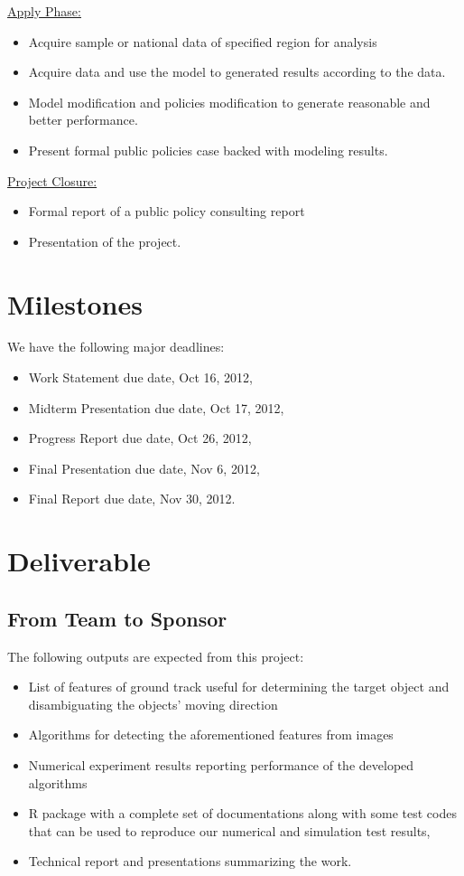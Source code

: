 \documentclass[12pt,letterpaper]{article}
\theoremstyle{definition}
\begin{document}
\underline {Apply Phase:}
\begin{itemize}
    \item Acquire sample or national data of specified region for analysis
    \item Acquire data and use the model to generated results according to the data.
    \item Model modification and policies modification to generate reasonable and better performance. 
    \item Present formal public policies case backed with modeling results. 
\end{itemize}

 
\underline {Project Closure:}
\begin{itemize}
    \item Formal report of a public policy consulting report
    \item Presentation of the project. 
\end{itemize}

 
\section{Milestones}
We have the following major deadlines:
\begin{itemize}
    \item Work Statement due date, Oct 16, 2012,
    \item Midterm Presentation due date, Oct 17, 2012,
    \item Progress Report due date, Oct 26, 2012,
    \item Final Presentation due date, Nov 6, 2012,
    \item Final Report due date, Nov 30, 2012.
\end{itemize}

\section{Deliverable}
\subsection{From Team to Sponsor} %
The following outputs are expected from this project:
\begin{itemize}
    \item List of features of ground track useful for determining the
        target object and disambiguating the objects' moving direction 
    \item Algorithms for detecting the aforementioned features from images
    \item Numerical experiment results reporting performance of the developed algorithms
    \item R package with a complete set of documentations along with some test 
        codes that can be used to reproduce our numerical and simulation test
        results,
    \item Technical report and presentations summarizing the work. 
\end{itemize}
\end{document}
